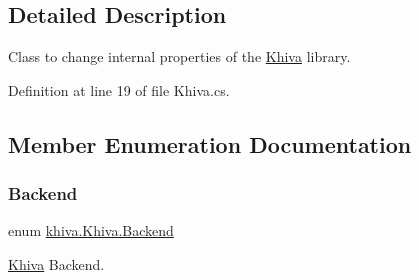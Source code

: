 \subsection{Detailed Description}
Class to change internal properties of the \mbox{\hyperlink{classkhiva_1_1_khiva}{Khiva}} library. 



Definition at line 19 of file Khiva.\+cs.



\subsection{Member Enumeration Documentation}
\mbox{\label{classkhiva_1_1_khiva_a149c512eefcef84e8e94eca721d8cd8f}} 
\subsubsection{\texorpdfstring{Backend}{Backend}}
{\footnotesize\ttfamily enum \mbox{\hyperlink{classkhiva_1_1_khiva_a149c512eefcef84e8e94eca721d8cd8f}{khiva.\+Khiva.\+Backend}}\hspace{0.3cm}{\ttfamily [strong]}}



\mbox{\hyperlink{classkhiva_1_1_khiva}{Khiva}} Backend. 

